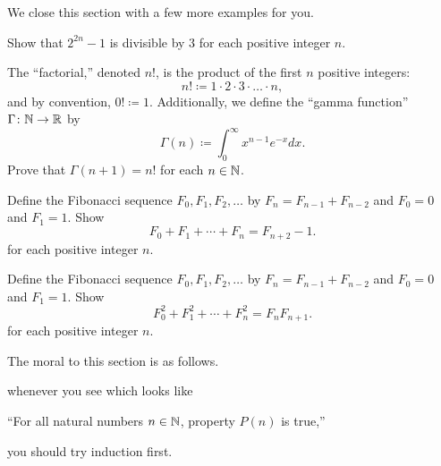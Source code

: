 \documentclass[../main.tex]{subfiles}
\begin{document}
We close this section with a few more examples for you.
\begin{exercise}
    Show that $2^{2n} - 1$ is divisible by 3 for each positive integer $n$.
\end{exercise}
\begin{exercise}
    The ``factorial,'' denoted $n!$, is the product of the first $n$ positive integers:
    \[n!\coloneqq1\cdot2\cdot3\cdot\ldots\cdot n,\]
    and by convention, $0!\coloneqq1$. Additionally, we define the ``gamma function'' $\Gamma\colon \mathbb N \to \mathbb R$ by
    \begin{equation*}
        \Gamma(n) \coloneqq \int_0^\infty x^{n - 1}e^{-x} dx.
    \end{equation*}
    Prove that $\Gamma(n + 1) = n!$ for each $n \in \mathbb N$.
\end{exercise}
\begin{exercise}
    Define the Fibonacci sequence $F_0,F_1,F_2,\ldots$ by $F_n=F_{n-1}+F_{n-2}$ and $F_0=0$ and $F_1=1$. Show
    \[F_0+F_1+\cdots+F_n=F_{n+2}-1.\]
    for each positive integer $n$.
\end{exercise}
\begin{exercise} \label{hw:fib}
    Define the Fibonacci sequence $F_0,F_1,F_2,\ldots$ by $F_n=F_{n-1}+F_{n-2}$ and $F_0=0$ and $F_1=1$. Show
    \[F_0^2+F_1^2+\cdots+F_n^2=F_nF_{n+1}.\]
    for each positive integer $n$.
\end{exercise}
The moral to this section is as follows.
\begin{idea}
    whenever you see which looks like
    \begin{center}
        ``For all natural numbers $n \in \mathbb N$, property $P(n)$ is true,''
    \end{center}
    you should try induction first.
\end{idea}
\end{document}
